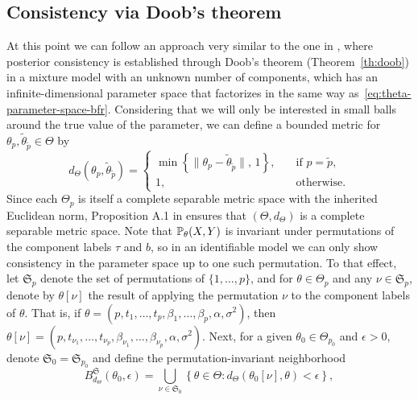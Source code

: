 \subsection{Consistency via Doob's theorem}

At this point we can follow an approach very similar to the one in \citet{miller2023consistency}, where posterior consistency is established through Doob's theorem (Theorem~\ref{th:doob}) in a mixture model with an unknown number of components, which has an infinite-dimensional parameter space that factorizes in the same way as~\eqref{eq:theta-parameter-space-bfr}. Considering that we will only be interested in small balls around the true value of the parameter, we can define a bounded metric for \(\theta_p, \tilde\theta_{\tilde p} \in \Theta\) by
\begin{equation}\label{eq:metric-doob}
  d_\Theta(\theta_p, \tilde\theta_{\tilde p})= \begin{cases}
    \min \left\{\|\theta_p - \tilde\theta_{\tilde p}\|,\, 1\right\}, \quad & \text{if } p=\tilde{p}, \\
    1, \quad                                           & \text{otherwise}.
  \end{cases}
\end{equation}
Since each \(\Theta_p\) is itself a complete separable metric space with the inherited Euclidean norm, Proposition A.1 in \citet{miller2023consistency} ensures that \((\Theta, d_\Theta)\) is a complete separable metric space. Note that \(\mathbb{P}_\theta(X,Y)\) is invariant under permutations of the component labels \(\tau\) and \(b\), so in an identifiable model we can only show consistency in the parameter space up to one such permutation. To that effect, let \(\mathfrak{S}_p\) denote the set of permutations of \(\{1,\dots,p\}\), and for \(\theta \in \Theta_p\) and any \(\nu\in \mathfrak{S}_p\), denote by \(\theta[\nu]\) the result of applying the permutation \(\nu\) to the component labels of \(\theta\). That is, if \(\theta=(p, t_1,\dots, t_p, \beta_1,\dots,\beta_p, \alpha,\sigma^2)\), then \(\theta[\nu]=(p, t_{\nu_1},\dots, t_{\nu_p}, \beta_{\nu_1},\dots,\beta_{\nu_p}, \alpha,\sigma^2)\). Next, for a given \(\theta_0\in\Theta_{p_0}\) and \(\epsilon>0\), denote \(\mathfrak{S}_0=\mathfrak{S}_{p_0}\) and define the permutation-invariant neighborhood 
\begin{equation}\label{eq:neighborhood-doob-permutation}
  B_{d_\Theta}^{\mathfrak{S}}(\theta_0, \epsilon) =\bigcup_{\nu\in \mathfrak{S}_0} \left\{\theta \in \Theta: d_\Theta(\theta_0[\nu], \theta) < \epsilon \right\},
\end{equation}
